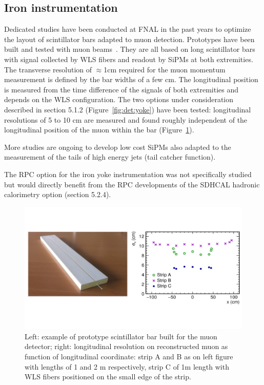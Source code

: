 


\subsection{Iron instrumentation}

Dedicated studies have been conducted at FNAL in the past years to optimize the layout of scintillator bars adapted to muon detection. Prototypes have been built and tested with muon beams~\cite{Denisov:2015jjl}. They are all based on long scintillator bars with signal collected by WLS fibers and readout by SiPMs at both extremities. The transverse resolution of $\approx$1cm required for the muon momentum measurement is defined by the bar widths of a few cm. The longitudinal position is measured from the time difference of the signals of both extremities and depends on the WLS configuration. The two options under consideration described in section 5.1.2 (Figure~\ref{fig:det:yoke}) have been tested: longitudinal resolutions of 5 to 10 cm are measured and found roughly independent of the longitudinal position of the muon within the bar (Figure~\ref{fig:det:Iron_proto}). 

More studies are ongoing to develop low cost SiPMs also adapted to the measurement of the tails of high energy jets (tail catcher function). 

The RPC option for the iron yoke instrumentation was not specifically studied but would directly benefit from the RPC developments of the SDHCAL hadronic calorimetry option (section 5.2.4).   


\begin{figure}[t!]
\centering
\includegraphics[width=1.0\hsize]{Detector/fig/Iron_proto.jpg}
\caption{Left: example of prototype scintillator bar built for the muon detector; right: longitudinal resolution on reconstructed muon as function of longitudinal coordinate: strip A and B as on left figure with lengths of 1 and 2 m respectively, strip C of 1m length with WLS fibers positioned on the small edge of the strip.}
\label{fig:det:Iron_proto}
\end{figure}

\vspace{2cm}
